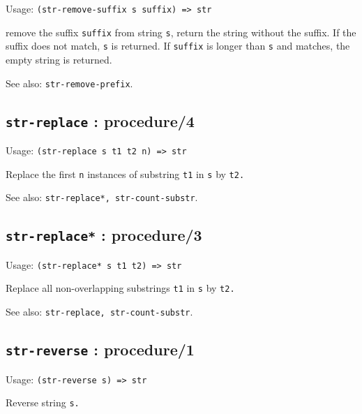 \documentclass[
]{article}
\newcommand{\passthrough}[1]{#1}
\begin{document}
Usage: \passthrough{\lstinline!(str-remove-suffix s suffix) => str!}

remove the suffix \passthrough{\lstinline!suffix!} from string
\passthrough{\lstinline!s!}, return the string without the suffix. If
the suffix does not match, \passthrough{\lstinline!s!} is returned. If
\passthrough{\lstinline!suffix!} is longer than
\passthrough{\lstinline!s!} and matches, the empty string is returned.

See also: \passthrough{\lstinline!str-remove-prefix!}.

\hypertarget{str-replace-procedure4-1}{%
\subsection{\texorpdfstring{\texttt{str-replace} :
procedure/4}{str-replace : procedure/4}}\label{str-replace-procedure4-1}}

Usage: \passthrough{\lstinline!(str-replace s t1 t2 n) => str!}

Replace the first \passthrough{\lstinline!n!} instances of substring
\passthrough{\lstinline!t1!} in \passthrough{\lstinline!s!} by
\passthrough{\lstinline!t2.!}

See also: \passthrough{\lstinline!str-replace*, str-count-substr!}.

\hypertarget{str-replace-procedure3-1}{%
\subsection{\texorpdfstring{\texttt{str-replace*} :
procedure/3}{str-replace* : procedure/3}}\label{str-replace-procedure3-1}}

Usage: \passthrough{\lstinline!(str-replace* s t1 t2) => str!}

Replace all non-overlapping substrings \passthrough{\lstinline!t1!} in
\passthrough{\lstinline!s!} by \passthrough{\lstinline!t2.!}

See also: \passthrough{\lstinline!str-replace, str-count-substr!}.

\hypertarget{str-reverse-procedure1-1}{%
\subsection{\texorpdfstring{\texttt{str-reverse} :
procedure/1}{str-reverse : procedure/1}}\label{str-reverse-procedure1-1}}

Usage: \passthrough{\lstinline!(str-reverse s) => str!}

Reverse string \passthrough{\lstinline!s.!}
\end{document}

